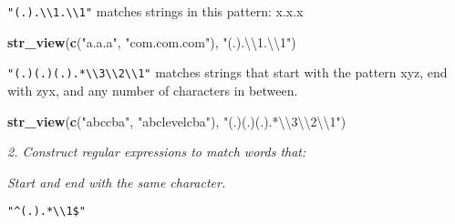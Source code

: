 \documentclass[]{article}
\newenvironment{Shaded}{\begin{snugshade}}{\end{snugshade}}
\newcommand{\KeywordTok}[1]{\textcolor[rgb]{0.13,0.29,0.53}{\textbf{#1}}}
\newcommand{\CharTok}[1]{\textcolor[rgb]{0.31,0.60,0.02}{#1}}
\newcommand{\StringTok}[1]{\textcolor[rgb]{0.31,0.60,0.02}{#1}}
\newcommand{\NormalTok}[1]{#1}
\theoremstyle{definition}
\theoremstyle{definition}
\theoremstyle{definition}
\theoremstyle{remark}
\begin{document}
\texttt{"(.).\textbackslash{}\textbackslash{}1.\textbackslash{}\textbackslash{}1"}
matches strings in this pattern: x.x.x

\begin{Shaded}
\begin{Highlighting}[]
\KeywordTok{str_view}\NormalTok{(}\KeywordTok{c}\NormalTok{(}\StringTok{"a.a.a"}\NormalTok{, }\StringTok{"com.com.com"}\NormalTok{), }\StringTok{"(.).}\CharTok{\textbackslash{}\textbackslash{}}\StringTok{1.}\CharTok{\textbackslash{}\textbackslash{}}\StringTok{1"}\NormalTok{)}
\end{Highlighting}
\end{Shaded}

\hypertarget{htmlwidget-db0452c6b23a1a045230}{}

\texttt{"(.)(.)(.).*\textbackslash{}\textbackslash{}3\textbackslash{}\textbackslash{}2\textbackslash{}\textbackslash{}1"}
matches strings that start with the pattern xyz, end with zyx, and any
number of characters in between.

\begin{Shaded}
\begin{Highlighting}[]
\KeywordTok{str_view}\NormalTok{(}\KeywordTok{c}\NormalTok{(}\StringTok{"abccba"}\NormalTok{, }\StringTok{"abclevelcba"}\NormalTok{), }\StringTok{"(.)(.)(.).*}\CharTok{\textbackslash{}\textbackslash{}}\StringTok{3}\CharTok{\textbackslash{}\textbackslash{}}\StringTok{2}\CharTok{\textbackslash{}\textbackslash{}}\StringTok{1"}\NormalTok{)}
\end{Highlighting}
\end{Shaded}

\hypertarget{htmlwidget-282e4956e8897866f6c0}{}

\emph{2. Construct regular expressions to match words that:}

\emph{Start and end with the same character.}

\texttt{"\^{}(.).*\textbackslash{}\textbackslash{}1\$"}

\begin{Shaded}
\end{Shaded}

\hypertarget{htmlwidget-6eec591b8efdd63f6d39}{}
\end{document}
